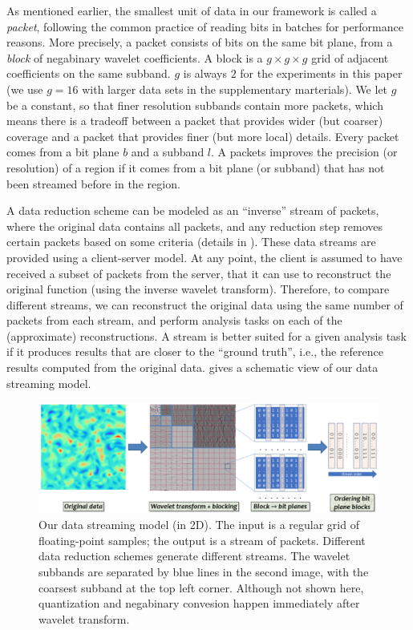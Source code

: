 As mentioned earlier, the smallest unit of data in our framework is called a \emph{packet},
following the common practice of reading bits in batches for performance reasons. More precisely, a
packet consists of bits on the same bit plane, from a \emph{block} of negabinary wavelet
coefficients. A block is a $g\times g\times g$ grid of adjacent coefficients on the same subband.
$g$ is always $2$ for the experiments in this paper (we use $g=16$ with larger data sets in the
supplementary marterials). We let $g$ be a constant, so that finer resolution subbands contain more
packets, which means there is a tradeoff between a packet that provides wider (but coarser) coverage
and a packet that provides finer (but more local) details. Every packet comes from a bit plane $b$
and a subband $l$. A packets improves the precision (or resolution) of a region if it comes from a
bit plane (or subband) that has not been streamed before in the region.

A data reduction scheme can be modeled as an ``inverse'' stream of packets, where the original data
contains all packets, and any reduction step removes certain packets based on some criteria (details
in ).  These data streams are provided using a client-server model.
At any point, the client is assumed to have received a subset of packets from the server, that it
can use to reconstruct the original function (using the inverse wavelet transform). Therefore, to
compare different streams, we can reconstruct the original data using the same number of packets
from each stream, and perform analysis tasks on each of the (approximate) reconstructions. A stream
is better suited for a given analysis task if it produces results that are closer to the ``ground
truth'', i.e., the reference results computed from the original data.  gives a
schematic view of our data streaming model.

\begin{figure}[h]
\centering
\includegraphics[width=\linewidth]{img/pipeline.png}
\caption{Our data streaming model (in 2D). The input is a regular grid of floating-point samples;
the output is a stream of packets. Different data reduction schemes generate different streams.  The
wavelet subbands are separated by blue lines in the second image, with the coarsest subband at the
top left corner. Although not shown here, quantization and negabinary convesion happen immediately
after wavelet transform. }\label{fig:pipeline}
\end{figure}

